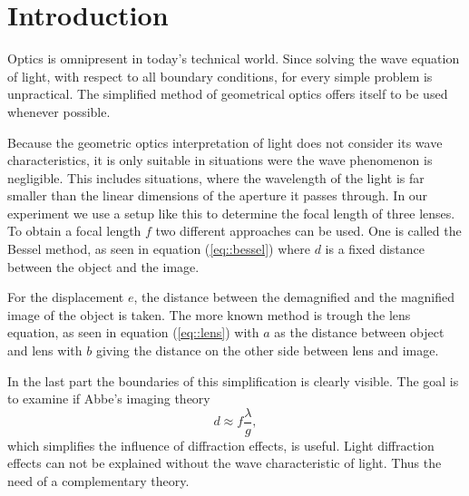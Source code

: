 \section{Introduction}
Optics is omnipresent in today's technical world.
Since solving the wave equation of light, with respect to all boundary conditions, for every simple problem is unpractical.
The simplified method of geometrical optics offers itself to be used whenever possible.

Because the geometric optics interpretation of light does not consider its wave characteristics, it is only suitable in situations were the wave phenomenon is negligible.
This includes situations, where the wavelength of the light is far smaller than the linear dimensions of the aperture it passes through. 
In our experiment we use a setup like this to determine the focal length of three lenses. 
To obtain a focal length $f$ two different approaches can be used.
One is called the Bessel method\cite {manual}, as seen in equation (\ref{eq::bessel})
where $d$ is a fixed distance between the object and the image.


For the displacement $e$, the distance between the demagnified and the magnified image of the object is taken.
The more known method is trough the lens equation\cite{manual}, as seen in equation (\ref{eq::lens})
with $a$ as the distance between object and lens with $b$ giving the distance on the other side between lens and image.

In the last part the boundaries of this simplification is clearly visible. 
The goal is to examine if Abbe's imaging theory \cite{manual}
\begin{equation}
d \approx f\frac{\lambda}{g},
\label{eq::diff}
\end{equation}
which simplifies the influence of diffraction effects, is useful. 
Light diffraction effects can not be explained without the wave characteristic of light.
Thus the need of a complementary theory.
